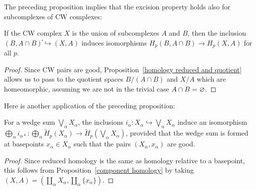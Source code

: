 The preceding proposition implies that the excision property holds also for subcomplexes of CW complexes:
\begin{corollary}
If the CW complex $X$ is the union of subcomplexes $A$ and $B$, then the inclusion $(B,A\cap B)֓\hookrightarrow(X,A)$ induces isomorphisms $H_p(B,A\cap B)\to H_p(X,A)$ for all $p$.
\end{corollary}
\begin{proof}
Since CW pairs are good, Proposition~\ref{homology reduced and quotient} allows us to pass to the quotient spaces $B/(A\cap B)$ and $X/A$ which are homeomorphic, assuming we are not in the trivial case $A\cap B=\varnothing$.
\end{proof}
Here is another application of the preceding proposition:
\begin{corollary}\label{homology wedge sum}
For a wedge sum $\bigvee_\alpha X_\alpha$, the inclusions $i_\alpha:X_\alpha\hookrightarrow\bigvee_\alpha X_\alpha$ induce an isomorphism $\bigoplus_\alpha i_{\alpha*}:\bigoplus_\alpha\widetilde{H}_p(X_\alpha)\to\widetilde{H}_p(\bigvee_\alpha X_\alpha)$, provided that the wedge sum is formed at basepoints $x_\alpha\in X_\alpha$ such that the pairs $(X_\alpha,x_\alpha)$ are good.
\end{corollary}
\begin{proof}
Since reduced homology is the same as homology relative to a basepoint, this
follows from Proposition~\ref{component homology} by taking $(X,A)=(\coprod_\alpha X_\alpha,\coprod_\alpha\{x_\alpha\})$.
\end{proof}
